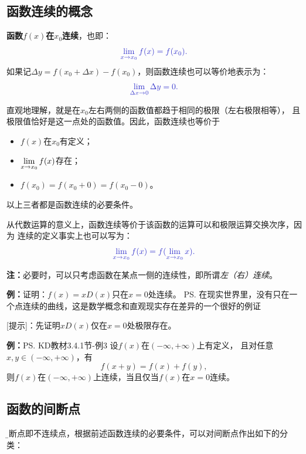 \subsection{函数连续的概念}

{\bf 函数$f(x)$在$x_0$连续}，也即：
$$\b\limx{x_0}f(x)=f(x_0).$$
如果记$\Delta y=f(x_0+\Delta x)-f(x_0)$，则函数连续也可以等价地表示为：
$$\b\lim\limits_{\Delta x\to 0}\Delta y=0.$$

直观地理解，就是在$x_0$左右两侧的函数值都趋于相同的极限（左右极限相等），
且极限值恰好是这一点处的函数值。因此，函数连续也等价于
\begin{itemize}
  \setlength{\itemindent}{1cm}
  \item $f(x)$在$x_0$有定义； 
  \item $\lim\limits_{x\to{x_0}}f(x)$存在； 
  \item $f(x_0)=f(x_0+0)=f(x_0-0)$。
\end{itemize}
以上三者都是函数连续的必要条件。

从代数运算的意义上，函数连续等价于该函数的运算可以和极限运算交换次序，因为
连续的定义事实上也可以写为：
$$\b\limx{x_0}f(x)=f(\limx{x_0}x).$$

{\bf 注：}必要时，可以只考虑函数在某点一侧的连续性，即所谓{\it 左（右）连续}。

{\bf 例：}证明：$f(x)=xD(x)$只在$x=0$处连续。
\ps{在现实世界里，没有只在一个点连续的曲线，这是数学概念和直观现实存在差异的一个很好的例证}

[提示]：先证明$xD(x)$仅在$x=0$处极限存在。

{\bf 例：}\ps{KD教材3.4.1节-例3}
设$f(x)$在$(-\infty,+\infty)$上有定义，
且对任意$x,y\in (-\infty,+\infty)$，有
$$f(x+y)=f(x)+f(y),$$
则$f(x)$在$(-\infty,+\infty)$上连续，当且仅当$f(x)$在$x=0$连续。


\subsection{函数的间断点}

{\b 间断点}即不连续点，根据前述函数连续的必要条件，可以对间断点作出如下的分类：


